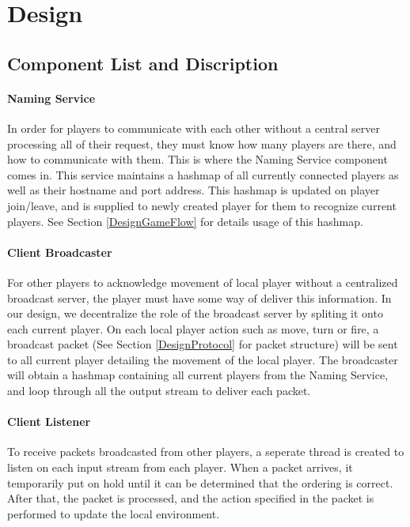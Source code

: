 \section{Design}\label{Design}

\subsection{Component List and Discription}\label{DesignComponent}

\paragraph*{Naming Service}

In order for players to communicate with each other without a central server processing all of their request, they must know how many players are there, and how to communicate with them. This is where the Naming Service component comes in. This service maintains a hashmap of all currently connected players as well as their hostname and port address. This hashmap is updated on player join/leave, and is supplied to newly created player for them to recognize current players. See Section \ref{DesignGameFlow} for details usage of this hashmap.

\paragraph*{Client Broadcaster}

For other players to acknowledge movement of local player without a centralized broadcast server, the player must have some way of deliver this information. In our design, we decentralize the role of the broadcast server by spliting it onto each current player. On each local player action such as move, turn or fire, a broadcast packet (See Section \ref{DesignProtocol} for packet structure) will be sent to all current player detailing the movement of the local player. The broadcaster will obtain a hashmap containing all current players from the Naming Service, and loop through all the output stream to deliver each packet.

\paragraph*{Client Listener}

To receive packets broadcasted from other players, a seperate thread is created to listen on each input stream from each player. When a packet arrives, it temporarily put on hold until it can be determined that the ordering is correct. After that, the packet is processed, and the action specified in the packet is performed to update the local environment.

